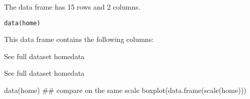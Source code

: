 \begin{Description}\relax
The  data frame has 15 rows and 2 columns.
\end{Description}
\begin{Usage}
\begin{verbatim}data(home)\end{verbatim}
\end{Usage}
\begin{Format}\relax
This data frame contains the following columns:
\end{Format}
\begin{Details}\relax
See full dataset homedata
\end{Details}
\begin{Source}\relax
See full dataset homedata
\end{Source}
\begin{Examples}
\begin{ExampleCode}
data(home)
## compare on the same scale
boxplot(data.frame(scale(home))) 
\end{ExampleCode}
\end{Examples}

